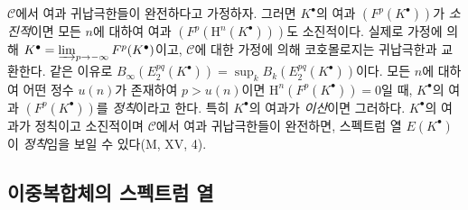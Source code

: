 \begin{env}[11.2.4]
\label{0.11.2.4-fr}
$\mathcal C$에서 여과 귀납극한들이 완전하다고 가정하자. 그러면
$K^\bullet$의 여과 $(F^p(K^\bullet))$가 \emph{소진적}이면 모든 $n$에
대하여 여과 $(F^p(\mathrm H^n(K^\bullet)))$도 소진적이다. 실제로 가정에
의해 $K^\bullet=\varinjlim_{p\to-\infty}F^p(K^\bullet)$이고,
$\mathcal C$에 대한 가정에 의해 코호몰로지는 귀납극한과 교환한다. 같은
이유로
$B_\infty(E_2^{pq}(K^\bullet))=\sup_k B_k(E_2^{pq}(K^\bullet))$이다.
모든 $n$에 대하여 어떤 정수 $u(n)$가 존재하여 $p>u(n)$이면
$\mathrm H^n(F^p(K^\bullet))=0$일 때, $K^\bullet$의 여과
$(F^p(K^\bullet))$를 \emph{정칙}이라고 한다. 특히 $K^\bullet$의 여과가
\emph{이산}이면 그러하다. $K^\bullet$의 여과가 정칙이고 소진적이며
$\mathcal C$에서 여과 귀납극한들이 완전하면, 스펙트럼 열
$E(K^\bullet)$이 \emph{정칙}임을 보일 수 있다(M, XV, 4).
\end{env}

\subsection{이중복합체의 스펙트럼 열}
\label{subsection:0.11.3-fr}

